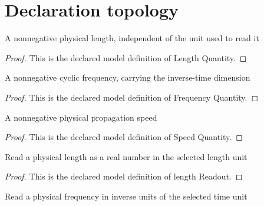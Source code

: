 \section{Declaration topology}
\begin{definition}
  \label{def:physics:phyx-mini-0318:phyxminiproblems-problemphyxmini0318-lengthquantity}
  A nonnegative physical length, independent of the unit used to read it
\end{definition}
\begin{proof}
  This is the declared model definition of Length Quantity.
\end{proof}
\begin{definition}
  \label{def:physics:phyx-mini-0318:phyxminiproblems-problemphyxmini0318-frequencyquantity}
  A nonnegative cyclic frequency, carrying the inverse-time dimension
\end{definition}
\begin{proof}
  This is the declared model definition of Frequency Quantity.
\end{proof}
\begin{definition}
  \label{def:physics:phyx-mini-0318:phyxminiproblems-problemphyxmini0318-speedquantity}
  A nonnegative physical propagation speed
\end{definition}
\begin{proof}
  This is the declared model definition of Speed Quantity.
\end{proof}
\begin{definition}
  \label{def:physics:phyx-mini-0318:phyxminiproblems-problemphyxmini0318-lengthreadout}
  Read a physical length as a real number in the selected length unit
\end{definition}
\begin{proof}
  This is the declared model definition of length Readout.
\end{proof}
\begin{definition}
  \label{def:physics:phyx-mini-0318:phyxminiproblems-problemphyxmini0318-frequencyreadout}
  Read a physical frequency in inverse units of the selected time unit
\end{definition}

